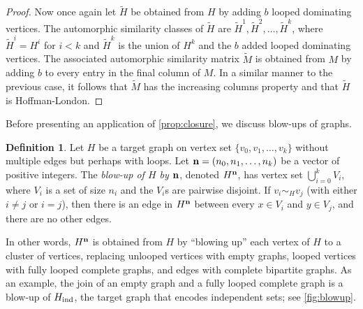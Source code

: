 \documentclass[11pt]{article}
\theoremstyle{definition}
\newtheorem{definition}[theorem]{Definition}
\begin{document}
\begin{proof}
Now once again let $\widetilde{H}$ be obtained from $H$ by adding $b$ looped dominating vertices. The automorphic similarity classes of $\widetilde{H}$ are $\widetilde{H}^1, \widetilde{H}^2, \ldots, \widetilde{H}^k$, where $\widetilde{H}^i=H^i$ for $i < k$ and $\widetilde{H}^k$ is the union of $H^k$ and the $b$ added looped dominating vertices. The associated automorphic similarity matrix $\widetilde{M}$ is obtained from $M$ by adding $b$ to every entry in the final column of $M$. In a similar manner to the previous case, it follows that $\widetilde{M}$ has the increasing columns property and that $\widetilde{H}$ is Hoffman-London.
\end{proof}

Before presenting an application of \cref{prop:closure}, we discuss blow-ups of graphs. 
\begin{definition}
Let $H$ be a target graph on vertex set $\{v_0, v_1, \ldots, v_k\}$ without multiple edges but perhaps with loops. Let ${\bf n}=(n_0, n_1, \ldots, n_k)$ be a vector of positive integers. The {\it blow-up of $H$ by ${\bf n}$}, denoted $H^{\bf n}$, has vertex set $\bigcup_{i=0}^k V_i$, where $V_i$ is a set of size $n_i$ and the $V_i$s are pairwise disjoint. If $v_i \sim_H v_j$ (with either $i \ne j$ or $i=j$), then there is an edge in $H^{\bf n}$ between every $x \in V_i$ and $y \in V_j$, and there are no other edges. 
\end{definition}
\noindent In other words, $H^{\bf n}$ is obtained from $H$ by ``blowing up'' each vertex of $H$ to a cluster of vertices, replacing unlooped vertices with empty graphs, looped vertices with fully looped complete graphs, and edges with complete bipartite graphs. As an example, the join of an empty graph and a fully looped complete graph is a blow-up of $H_{\rm ind}$, the target graph that encodes independent sets; see \cref{fig:blowup}.
\end{document}
